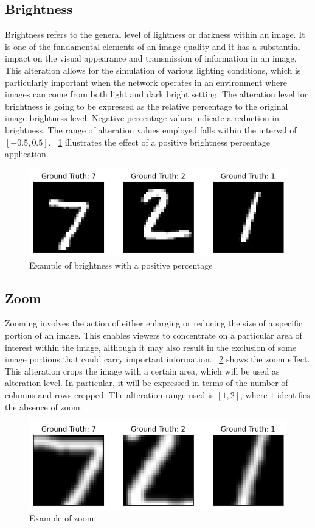 \subsection{Brightness}

Brightness refers to the general level of lightness or darkness within an image. It is one of the fundamental elements of an image quality and it has a substantial impact on the visual appearance and transmission of information in an image. This alteration allows for the simulation of various lighting conditions, which is particularly important when the network operates in an environment where images can come from both light and dark bright setting. The alteration level for brightness is going to be expressed as the relative percentage to the original image brightness level. Negative percentage values indicate a reduction in brightness. The range of alteration values employed falls within the interval of $[-0.5, 0.5]$. \Fig~\ref{fig:Brightness} illustrates the effect of a positive brightness percentage application.

\begin{figure}[h]
	\centering
	\includegraphics[width=0.6\linewidth]{ImageFiles/Alterations/Brightness}
	\caption{Example of brightness with a positive percentage}
	\label{fig:Brightness}
\end{figure}

\subsection{Zoom}
Zooming involves the action of either enlarging or reducing the size of a specific portion of an image. This enables viewers to concentrate on a particular area of interest within the image, although it may also result in the exclusion of some image portions that could carry important information. \Fig~\ref{fig:Zoom} shows the zoom effect. This alteration crops the image with a certain area, which will be used as alteration level. In particular, it will be expressed in terms of the number of columns and rows cropped. The alteration range used is $[1,2]$, where $1$ identifies the absence of zoom.

\begin{figure}[h]
	\centering
	\includegraphics[width=0.6\linewidth]{ImageFiles/Alterations/Zoom}
	\caption{Example of zoom}
	\label{fig:Zoom}
\end{figure}

